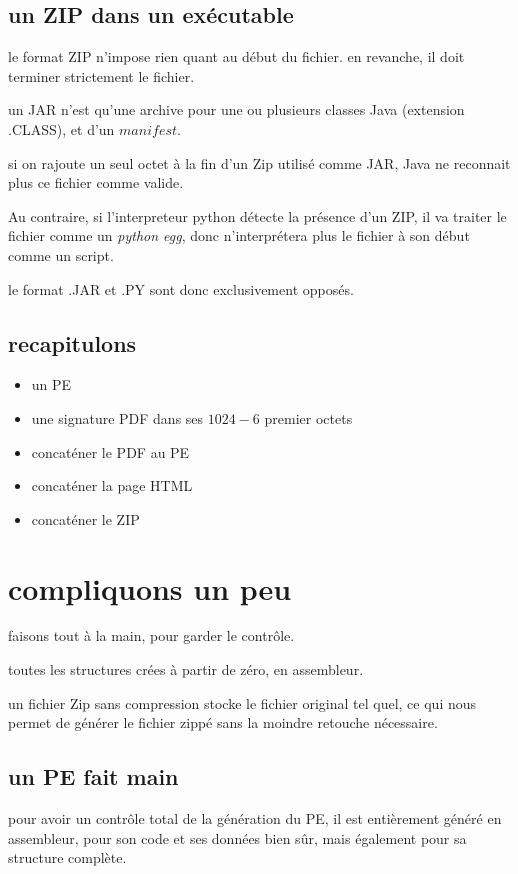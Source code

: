 \subsection{un ZIP dans un exécutable}
le format ZIP n'impose rien quant au début du fichier.
en revanche, il doit terminer strictement le fichier.

un JAR n'est qu'une archive pour une ou plusieurs classes Java (extension .CLASS), et d'un $manifest$.

si on rajoute un seul octet à la fin d'un Zip utilisé comme JAR, Java ne reconnait plus ce fichier comme valide.

Au contraire, si l'interpreteur python détecte la présence d'un ZIP, il va traiter le fichier comme un {\em python egg}, donc n'interprétera plus le fichier à son début comme un script.

le format .JAR et .PY sont donc exclusivement opposés.


\subsection{recapitulons}
\begin{itemize}
\item un PE
\item une signature PDF dans ses $1024 - 6$ premier octets
\item concaténer le PDF au PE
\item concaténer la page HTML
\item concaténer le ZIP
\end{itemize}

\section{compliquons un peu}
faisons tout à la main, pour garder le contrôle.

toutes les structures crées à partir de zéro, en assembleur.

un fichier Zip sans compression stocke le fichier original tel quel, ce qui nous permet de générer le fichier zippé sans la moindre retouche nécessaire.

\subsection{un PE fait main}
pour avoir un contrôle total de la génération du PE, il est entièrement généré en assembleur, pour son code et ses données bien sûr, mais également pour sa structure complète.

